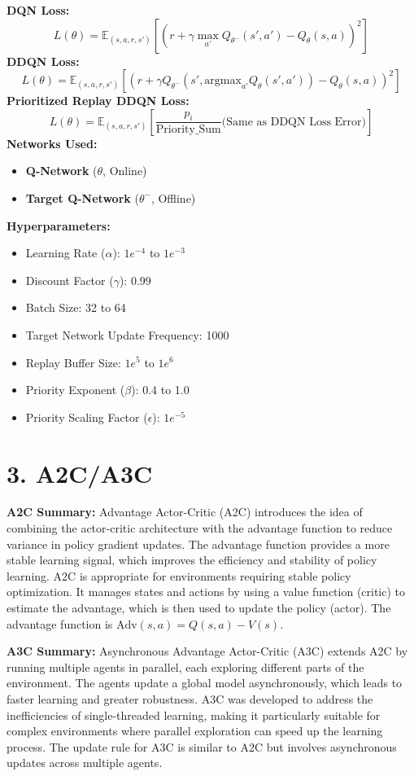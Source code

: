 \documentclass[a4paper,10pt]{article}
\begin{document}
\begin{multicols}{2}
\noindent \textbf{DQN Loss:}
\[
L(\theta) = \mathbb{E}_{(s, a, r, s')} \left[ \left( r + \gamma \max_{a'} Q_{\theta^-}(s', a') - Q_\theta(s, a) \right)^2 \right]
\]
\textbf{DDQN Loss:}
\[
L(\theta) = \mathbb{E}_{(s, a, r, s')} \left[ \left( r + \gamma Q_{\theta^-}(s', \text{argmax}_{a'} Q_\theta(s', a')) - Q_\theta(s, a) \right)^2 \right]
\]
\textbf{Prioritized Replay DDQN Loss:}
\[
L(\theta) = \mathbb{E}_{(s, a, r, s')} \left[ \frac{p_i}{\text{Priority\_Sum}} \text{(Same as DDQN Loss Error)} \right]
\]
\textbf{Networks Used:} 
\begin{itemize}
    \item \textbf{Q-Network} (\(\theta\), Online)
    \item \textbf{Target Q-Network} (\(\theta^-\), Offline)
\end{itemize}
\textbf{Hyperparameters:}
\begin{itemize}
    \item Learning Rate (\(\alpha\)): \(1e^{-4}\) to \(1e^{-3}\)
    \item Discount Factor (\(\gamma\)): 0.99
    \item Batch Size: 32 to 64
    \item Target Network Update Frequency: 1000
    \item Replay Buffer Size: \(1e^5\) to \(1e^6\)
    \item Priority Exponent (\(\beta\)): 0.4 to 1.0
    \item Priority Scaling Factor (\(\epsilon\)): \(1e^{-5}\)
\end{itemize}

\section*{3. A2C/A3C}
\textbf{A2C Summary:} Advantage Actor-Critic (A2C) introduces the idea of combining the actor-critic architecture with the advantage function to reduce variance in policy gradient updates. The advantage function provides a more stable learning signal, which improves the efficiency and stability of policy learning. A2C is appropriate for environments requiring stable policy optimization. It manages states and actions by using a value function (critic) to estimate the advantage, which is then used to update the policy (actor). The advantage function is \( \text{Adv}(s, a) = Q(s, a) - V(s) \).

\noindent \textbf{A3C Summary:} Asynchronous Advantage Actor-Critic (A3C) extends A2C by running multiple agents in parallel, each exploring different parts of the environment. The agents update a global model asynchronously, which leads to faster learning and greater robustness. A3C was developed to address the inefficiencies of single-threaded learning, making it particularly suitable for complex environments where parallel exploration can speed up the learning process. The update rule for A3C is similar to A2C but involves asynchronous updates across multiple agents.


\end{multicols}
\end{document}
